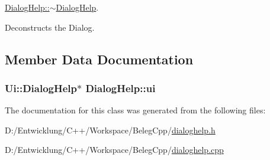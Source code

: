 \hyperlink{class_dialog_help_a4c076a8c67ad264caf067c9135911839}{Dialog\+Help\+::$\sim$\+Dialog\+Help}. 

Deconstructs the Dialog. 

\subsection{Member Data Documentation}
\hypertarget{class_dialog_help_a7e241423eb5ac274a3f1bde98ad625dd}{
\subsubsection[{ui}]{\setlength{\rightskip}{0pt plus 5cm}Ui\+::\+Dialog\+Help$\ast$ Dialog\+Help\+::ui\hspace{0.3cm}{\ttfamily [private]}}}\label{class_dialog_help_a7e241423eb5ac274a3f1bde98ad625dd}


The documentation for this class was generated from the following files\+:\begin{DoxyCompactItemize}
\item 
D\+:/\+Entwicklung/\+C++/\+Workspace/\+Beleg\+Cpp/\hyperlink{dialoghelp_8h}{dialoghelp.\+h}\item 
D\+:/\+Entwicklung/\+C++/\+Workspace/\+Beleg\+Cpp/\hyperlink{dialoghelp_8cpp}{dialoghelp.\+cpp}\end{DoxyCompactItemize}
